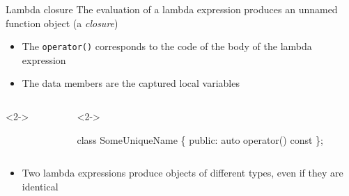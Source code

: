 \begin{frame}[fragile]{Lambda closure}
  The evaluation of a lambda expression produces an unnamed function object (a
  \textit{closure})
  \begin{itemize}
  \item The \texttt{operator()} corresponds to the code of the body of the
    lambda expression
  \item The data members are the captured local variables
  \end{itemize}

  \vskip -3mm

  \begin{columns}[t]
    \begin{column}{.5\textwidth}
      \begin{codeblock}<2->{


}\end{codeblock}

    \end{column}

    \begin{column}{.5\textwidth}
      \begin{codeblock}<2->{
class SomeUniqueName \{
 public:
  auto operator() const
\};

}\end{codeblock}
    \end{column}
  \end{columns}

  \begin{itemize}
  \item<7-> Two lambda expressions produce objects of different types, even if
    they are identical
  \end{itemize}

\end{frame}

